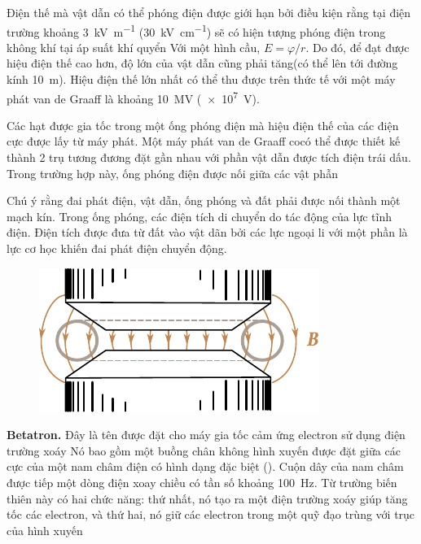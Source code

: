 Điện thế mà vật dẫn có thể phóng điện được giới hạn bởi điều kiện rằng tại điện trường khoảng \SI{3}{\kilo\volt\per\metre}
(\SI{30}{\kilo\volt\per\centi\metre}) sẽ có hiện tượng phóng điện trong không khí tại áp suất khí quyển
Với một hình cầu,  $E=\varphi/r$.
Do đó, để đạt được hiệu điện thế cao hơn, độ lớn của vật dẫn cũng phải tăng(có thể lên tới đường kính \SI{10}{\metre}).
Hiệu điện thế lớn nhất có thể thu được trên thức tế với một máy phát van de Graaff là khoảng \SI{10}{\mega\volt} (\SI{e7}{\volt}).

Các hạt được gia tốc trong một ống phóng điện mà hiệu điện thế của các điện cực được lấy từ máy phát. 
Một máy phát van de Graaff cocó thể được thiết kế thành 2 trụ tương đương đặt gần nhau với phần vật dẫn được tích điện trái dấu.
Trong trường hợp này, ống phóng điện được nối giữa các vật phẫn

Chú ý rằng đai phát điện, vật dẫn, ống phóng và đất phải được nối thành một mạch kín.
Trong ống phóng, các điện tích di chuyển do tác động của lực tĩnh điện.
Điện tích được đưa từ đất vào vật dãn bởi các lực ngoại li với một phần là lực cơ học khiến đai phát điện chuyển động.
\begin{figure}[t]
	\begin{center}
		\includegraphics[scale=1]{figures/ch_10/fig_10_15.pdf}
		\caption[]{}
		\label{fig:10_15}
	\end{center}
	\vspace{-0.8cm}
\end{figure}

\textbf{Betatron.} Đây là tên được đặt cho máy gia tốc cảm ứng electron sử dụng điện trường xoáy
Nó bao gồm một buồng chân không hình xuyến được đặt giữa các cực của một nam châm điện có hình dạng đặc biệt ().
Cuộn dây của nam châm được tiếp một dòng điện xoay chiều có tần số khoảng \SI{100}{\hertz}.
Từ trường biến thiên này có hai chức năng: thứ nhất, nó tạo ra một điện trường xoáy giúp tăng tốc các electron, và thứ hai, nó giữ các electron trong một quỹ đạo trùng với trục của hình xuyến

